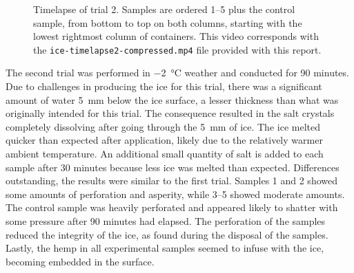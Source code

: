 \begin{figure}[t]
  \centering
  \label{mov:trial2}
  \caption{\small Timelapse of trial 2. Samples are ordered 1--5 plus the control sample, from bottom to top on both columns, starting with the lowest rightmost column of containers. This video corresponds with the \texttt{ice-timelapse2-compressed.mp4} file provided with this report.}
\end{figure}

The second trial was performed in \SI{-2}{\degreeCelsius} weather and conducted for 90 minutes.
Due to challenges in producing the ice for this trial, there was a significant amount of water \SI{5}{\mm} below the ice surface, a lesser thickness than what was originally intended for this trial.
The consequence resulted in the salt crystals completely dissolving after going through the \SI{5}{\mm} of ice.
The ice melted quicker than expected after application, likely due to the relatively warmer ambient temperature.
An additional small quantity of salt is added to each sample after 30 minutes because less ice was melted than expected.
Differences outstanding, the results were similar to the first trial.
Samples 1 and 2 showed some amounts of perforation and asperity, while 3--5 showed moderate amounts.
The control sample was heavily perforated and appeared likely to shatter with some pressure after 90 minutes had elapsed.
The perforation of the samples reduced the integrity of the ice, as found during the disposal of the samples.
Lastly, the hemp in all experimental samples seemed to infuse with the ice, becoming embedded in the surface.
